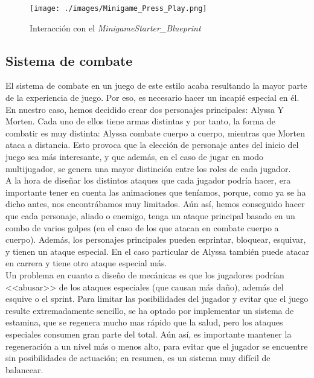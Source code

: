 \begin{figure}[H]
  \centering
  \texttt{[image: ./images/Minigame\_Press\_Play.png]}
  \caption{Interacción con el \textit{MinigameStarter_Blueprint}}
  \label{Minigamestarterinteraction}
\end{figure}

\subsection{Sistema de combate}
El sistema de combate en un juego de este estilo acaba resultando la mayor parte de la experiencia de juego. Por eso, es necesario hacer un incapié especial en él.
En nuestro caso, hemos decidido crear dos personajes principales: Alyssa Y Morten. Cada uno de ellos tiene armas distintas y por tanto, la forma de combatir es muy distinta: Alyssa combate cuerpo a cuerpo, mientras que Morten ataca a distancia. Esto provoca que la elección de personaje antes del inicio del juego sea más interesante, y que además, en el caso de jugar en modo multijugador, se genera una mayor distinción entre los roles de cada jugador. 
\\

A la hora de diseñar los distintos ataques que cada jugador podría hacer, era importante tener en cuenta las animaciones que teníamos, porque, como ya se ha dicho antes, nos encontrábamos muy limitados. Aún así, hemos conseguido hacer que cada personaje, aliado o enemigo, tenga un ataque principal basado en un combo de varios golpes (en el caso de los que atacan en combate cuerpo a cuerpo). Además, los personajes principales pueden esprintar, bloquear, esquivar, y tienen un ataque especial.
En el caso particular de Alyssa también puede atacar en carrera y tiene otro ataque especial más. 
\\

Un problema en cuanto a diseño de mecánicas es que los jugadores podrían <<abusar>> de los ataques especiales (que causan más daño), además del esquive o el sprint. Para limitar las posibilidades del jugador y evitar que el juego resulte extremadamente sencillo, se ha optado por implementar un sistema de estamina, que se regenera mucho mas rápido que la salud, pero los ataques especiales consumen gran parte del total. Aún así, es importante mantener la regeneración a un nivel más o menos alto, para evitar que el jugador se encuentre sin posibilidades de actuación; en resumen, es un sistema muy difícil de balancear. 
\\

